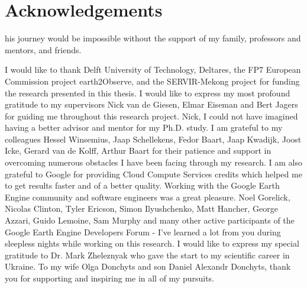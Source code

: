 \chapter*{Acknowledgements}
\label{acknowledgements}

his journey would be impossible without the support of my family, professors and mentors, and friends. 

I would like to thank Delft University of Technology, Deltares, the FP7 European Commission project earth2Observe, and the SERVIR-Mekong project for funding the research presented in this thesis. I would like to express my most profound gratitude to my supervisors Nick van de Giesen, Elmar Eiseman and Bert Jagers for guiding me throughout this research project. Nick, I could not have imagined having a better advisor and mentor for my Ph.D. study. I am grateful to my colleagues Hessel Winsemius, Jaap Schellekens, Fedor Baart, Jaap Kwadijk, Joost Icke, Gerard van de Kolff, Arthur Baart for their patience and support in overcoming numerous obstacles I have been facing through my research. I am also grateful to Google for providing Cloud Compute Services credits which helped me to get results faster and of a better quality. Working with the Google Earth Engine community and software engineers was a great pleasure. Noel Gorelick, Nicolas Clinton, Tyler Ericson, Simon Ilyushchenko, Matt Hancher, George Azzari, Guido Lemoine, Sam Murphy and many other active participants of the Google Earth Engine Developers Forum - I've learned a lot from you during sleepless nights while working on this research. I would like to express my special gratitude to Dr. Mark Zheleznyak who gave the start to my scientific career in Ukraine. To my wife Olga Donchyts and son Daniel Alexandr Donchyts, thank you for supporting and inspiring me in all of my pursuits.
